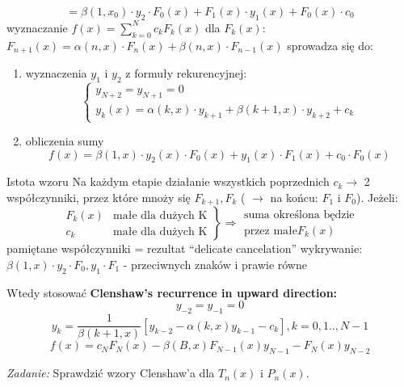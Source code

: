 \begin{frame}
	$$=\beta(1,x_0) \cdot y_2 \cdot F_0(x)+F_1(x) \cdot y_1(x) +F_0(x) \cdot c_0 $$
    wyznaczanie $f(x) = \sum_{k=0}^{N}c_kF_k(x)$ \newline
    dla $F_k(x)$: $F_{n+1}(x) = \alpha(n,x) \cdot F_n(x) + \beta(n,x) \cdot F_{n-1}(x)$ \newline
    sprowadza się do:
    \begin{enumerate}
    \item wyznaczenia $y_1$ i $y_2$ z formuły rekurencyjnej: \newline
    	$$\left\{\begin{array}{l}
    	y_{N+2} = y_{N+1} = 0 \\
        y_k(x) = \alpha(k,x) \cdot y_{k+1} + \beta(k+1,x) \cdot y_{k+2} +c_k
    	\end{array}\right.$$
     \item obliczenia sumy \newline
     $$f(x) = \beta(1,x) \cdot y_2(x) \cdot F_0(x) + y_1(x) \cdot F_1(x) + c_0 \cdot F_0(x)$$
    \end{enumerate}
\end{frame}
\begin{frame}{Istota wzoru}
	Na każdym etapie działanie wszystkich poprzednich $c_k \rightarrow$ 2 współczynniki, przez które mnoży się $F_{k+1},F_k$ ( $\rightarrow$ na końcu: $F_1$ i $F_0$).\newline
    Jeżeli:
    $$\left.\begin{array}{cl}
    	F_k(x) & \text{małe dla dużych K} \\
        c_k & \text{małe dla dużych K}
    \end{array}\right\} \Rightarrow\left.\begin{array}{c}
    	 \text{suma określona będzie} \\
         \text{przez małe} F_k(x)
    \end{array}\right.$$
    pamiętane współczynniki = rezultat ``delicate cancelation'' \newline
    wykrywanie: $\beta(1,x) \cdot y_2 \cdot F_0,y_1 \cdot F_1$ - przeciwnych znaków i prawie równe
\end{frame}
\begin{frame}
	Wtedy stosować \textbf{Clenshaw's recurrence in upward direction:}
    $$y_{-2} = y_{-1} = 0$$
    $$y_k = \frac{1}{\beta(k+1,x)}[y_{k-2}-\alpha(k,x)y_{k-1} - c_k], k=0,1..,N-1$$
    $$f(x) = c_NF_N(x) - \beta(B,x)F_{N-1}(x)y_{N-1} - F_N(x)y_{N-2}$$
    \begin{flushright}
    	\textit{Zadanie: } \quad Sprawdzić wzory Clenshaw'a dla $T_n(x)$ i $P_n(x)$.
    \end{flushright}
\end{frame}

